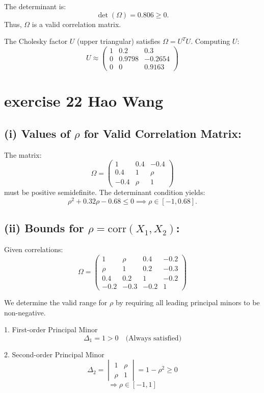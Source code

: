 \documentclass{article}
\begin{document}
The determinant is:
\[
    \det(\Omega) = 0.806 \geq 0.
\]
Thus, \(\Omega\) is a valid correlation matrix.

The Cholesky factor \(U\) (upper triangular) satisfies \(\Omega = U^TU\). Computing \(U\):
\[
    U \approx \begin{pmatrix}
        1 & 0.2    & 0.3     \\
        0 & 0.9798 & -0.2654 \\
        0 & 0      & 0.9163
    \end{pmatrix}
\]

\section{exercise 22 Hao Wang}

\subsection*{(i) Values of \(\rho\) for Valid Correlation Matrix:}

The matrix:
\[
    \Omega = \begin{pmatrix}
        1    & 0.4  & -0.4 \\
        0.4  & 1    & \rho \\
        -0.4 & \rho & 1
    \end{pmatrix}
\]
must be positive semidefinite. The determinant condition yields:
\[
    \rho^2 + 0.32\rho - 0.68 \leq 0 \implies \rho \in [-1, 0.68].
\]

\subsection*{(ii) Bounds for \(\rho = \text{corr}(X_1, X_2)\):}

Given correlations:
\[
    \Omega = \begin{pmatrix}
        1    & \rho & 0.4  & -0.2 \\
        \rho & 1    & 0.2  & -0.3 \\
        0.4  & 0.2  & 1    & -0.2 \\
        -0.2 & -0.3 & -0.2 & 1
    \end{pmatrix}
\]

We determine the valid range for $\rho$ by requiring all leading principal minors to be non-negative.

1. First-order Principal Minor
\[
    \Delta_1 = 1 > 0 \quad \text{(Always satisfied)}
\]

2. Second-order Principal Minor
\[
    \Delta_2 = \begin{vmatrix}
        1    & \rho \\
        \rho & 1
    \end{vmatrix} = 1 - \rho^2 \geq 0
\]
\[
    \Rightarrow \rho \in [-1, 1]
\]
\end{document}
